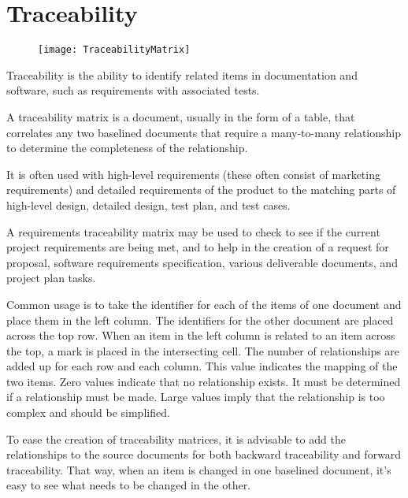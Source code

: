 \section{Traceability}
\label{sec:Traceability}

\begin{figure}[!h]
\centering
\texttt{[image: TraceabilityMatrix]}
\caption{}
\label{fig:TraceabilityMatrix}
\end{figure}

Traceability is the ability to identify related items in documentation and software, such as requirements with associated tests.

A traceability matrix is a document, usually in the form of a table, that correlates any two baselined documents that require a many-to-many relationship to determine the completeness of the relationship.

It is often used with high-level requirements (these often consist of marketing requirements) and detailed requirements of the product to the matching parts of high-level design, detailed design, test plan, and test cases.

A requirements traceability matrix may be used to check to see if the current project requirements are being met, and to help in the creation of a request for proposal, software requirements specification, various deliverable documents, and project plan tasks.

Common usage is to take the identifier for each of the items of one document and place them in the left column. The identifiers for the other document are placed across the top row. When an item in the left column is related to an item across the top, a mark is placed in the intersecting cell. The number of relationships are added up for each row and each column. This value indicates the mapping of the two items. Zero values indicate that no relationship exists. It must be determined if a relationship must be made. Large values imply that the relationship is too complex and should be simplified.

To ease the creation of traceability matrices, it is advisable to add the relationships to the source documents for both backward traceability and forward traceability. That way, when an item is changed in one baselined document, it's easy to see what needs to be changed in the other.
